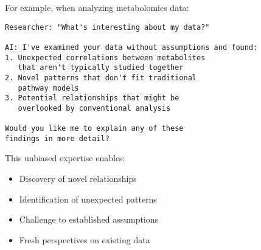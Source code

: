\documentclass[11pt,a4paper]{article}
\begin{document}
For example, when analyzing metabolomics data:
\begin{verbatim}
Researcher: "What's interesting about my data?"

AI: I've examined your data without assumptions and found:
1. Unexpected correlations between metabolites
   that aren't typically studied together
2. Novel patterns that don't fit traditional
   pathway models
3. Potential relationships that might be
   overlooked by conventional analysis

Would you like me to explain any of these
findings in more detail?
\end{verbatim}

This unbiased expertise enables:
\begin{itemize}
    \item Discovery of novel relationships
    \item Identification of unexpected patterns
    \item Challenge to established assumptions
    \item Fresh perspectives on existing data
\end{itemize}
\end{document}
